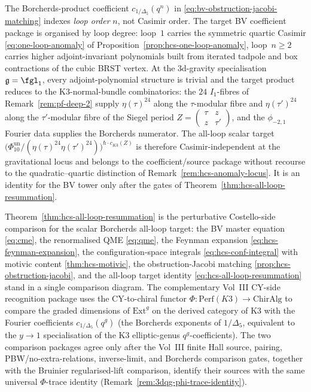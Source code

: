 \begin{remark}
\label{rem:hcs-loop-vs-casimir}
The Borcherds-product coefficient $c_{1/\Delta_{5}}(q^{n})$ in
\eqref{eq:bv-obstruction-jacobi-matching} indexes
\emph{loop order} $n$, not Casimir order. The target BV coefficient
package is organised by loop degree: loop~$1$ carries the symmetric
quartic Casimir \eqref{eq:one-loop-anomaly} of
Proposition~\ref{prop:hcs-one-loop-anomaly}, loop~$n \geq 2$ carries
higher adjoint-invariant polynomials built from iterated tadpole and
box contractions of the cubic BRST vertex. At the 3d-gravity specialisation
$\fg = \fgl_{1}$, every adjoint-polynomial structure is trivial and
the target product reduces to the K3-normal-bundle combinatorics: the
$24$ $I_{1}$-fibres of Remark~\ref{rem:pf-deep-2} supply
$\eta(\tau)^{24}$ along the $\tau$-modular fibre and $\eta(\tau')^{24}$
along the $\tau'$-modular fibre of the Siegel period
$Z=\begin{pmatrix}\tau&z\\z&\tau'\end{pmatrix}$, and the $\phi_{-2,1}$
Fourier data supplies the Borcherds numerator.
The all-loop scalar target
$\bigl(\Phi_{10}^{\mathrm{un}}/(\eta(\tau)^{24}\eta(\tau')^{24})\bigr)^{\hbar\cdot c_{K3}(Z)}$
is therefore Casimir-independent at the gravitational locus and
belongs to the coefficient/source package without recourse to the
quadratic--quartic distinction of
Remark~\ref{rem:hcs-anomaly-locus}.  It is an identity for the BV tower
only after the gates of Theorem~\ref{thm:hcs-all-loop-resummation}.
\end{remark}

\begin{remark}
\label{rem:hcs-two-sides}
Theorem~\ref{thm:hcs-all-loop-resummation} is the perturbative
Costello-side comparison for the scalar Borcherds all-loop target: the BV
master equation \eqref{eq:cme}, the renormalised QME \eqref{eq:qme},
the Feynman expansion \eqref{eq:hcs-feynman-expansion}, the
configuration-space integrals \eqref{eq:hcs-conf-integral} with motivic
content \ref{thm:hcs-motivic}, the obstruction-Jacobi matching
\ref{prop:hcs-obstruction-jacobi}, and the all-loop target identity
\eqref{eq:hcs-all-loop-resummation} stand in a single comparison
diagram. The complementary Vol~III CY-side recognition package uses
the CY-to-chiral functor $\Phi\colon\mathrm{Perf}(K3)\to\mathrm{ChirAlg}$
to compare the graded dimensions of $\mathrm{Ext}^{g}$ on the derived
category of K3 with the Fourier coefficients
$c_{1/\Delta_{5}}(q^{g})$ (the Borcherds exponents of $1/\Delta_5$,
equivalent to the $y\to 1$ specialisation of the K3 elliptic-genus
$q^{g}$-coefficients). The two comparison packages agree only after
the Vol~III finite Hall source, pairing, PBW/no-extra-relations,
inverse-limit, and Borcherds comparison gates, together with the
Bruinier regularised-lift comparison, identify their sources with the
same universal $\Phi$-trace identity
(Remark~\ref{rem:3dqg-phi-trace-identity}).
\end{remark}

